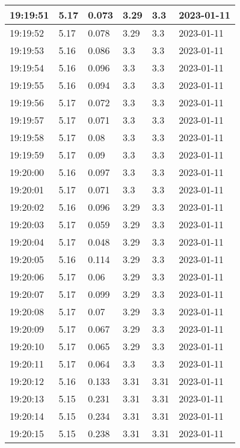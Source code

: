 \begin{longtable}{|l|l|l|l|l|l|}
        19:19:51 & 5.17 & 0.073 & 3.29 & 3.3 & 2023-01-11 \\ \hline
        19:19:52 & 5.17 & 0.078 & 3.29 & 3.3 & 2023-01-11 \\ \hline
        19:19:53 & 5.16 & 0.086 & 3.3 & 3.3 & 2023-01-11 \\ \hline
        19:19:54 & 5.16 & 0.096 & 3.3 & 3.3 & 2023-01-11 \\ \hline
        19:19:55 & 5.16 & 0.094 & 3.3 & 3.3 & 2023-01-11 \\ \hline
        19:19:56 & 5.17 & 0.072 & 3.3 & 3.3 & 2023-01-11 \\ \hline
        19:19:57 & 5.17 & 0.071 & 3.3 & 3.3 & 2023-01-11 \\ \hline
        19:19:58 & 5.17 & 0.08 & 3.3 & 3.3 & 2023-01-11 \\ \hline
        19:19:59 & 5.17 & 0.09 & 3.3 & 3.3 & 2023-01-11 \\ \hline
        19:20:00 & 5.16 & 0.097 & 3.3 & 3.3 & 2023-01-11 \\ \hline
        19:20:01 & 5.17 & 0.071 & 3.3 & 3.3 & 2023-01-11 \\ \hline
        19:20:02 & 5.16 & 0.096 & 3.29 & 3.3 & 2023-01-11 \\ \hline
        19:20:03 & 5.17 & 0.059 & 3.29 & 3.3 & 2023-01-11 \\ \hline
        19:20:04 & 5.17 & 0.048 & 3.29 & 3.3 & 2023-01-11 \\ \hline
        19:20:05 & 5.16 & 0.114 & 3.29 & 3.3 & 2023-01-11 \\ \hline
        19:20:06 & 5.17 & 0.06 & 3.29 & 3.3 & 2023-01-11 \\ \hline
        19:20:07 & 5.17 & 0.099 & 3.29 & 3.3 & 2023-01-11 \\ \hline
        19:20:08 & 5.17 & 0.07 & 3.29 & 3.3 & 2023-01-11 \\ \hline
        19:20:09 & 5.17 & 0.067 & 3.29 & 3.3 & 2023-01-11 \\ \hline
        19:20:10 & 5.17 & 0.065 & 3.29 & 3.3 & 2023-01-11 \\ \hline
        19:20:11 & 5.17 & 0.064 & 3.3 & 3.3 & 2023-01-11 \\ \hline
        19:20:12 & 5.16 & 0.133 & 3.31 & 3.31 & 2023-01-11 \\ \hline
        19:20:13 & 5.15 & 0.231 & 3.31 & 3.31 & 2023-01-11 \\ \hline
        19:20:14 & 5.15 & 0.234 & 3.31 & 3.31 & 2023-01-11 \\ \hline
        19:20:15 & 5.15 & 0.238 & 3.31 & 3.31 & 2023-01-11 \\ \hline

\end{longtable}
